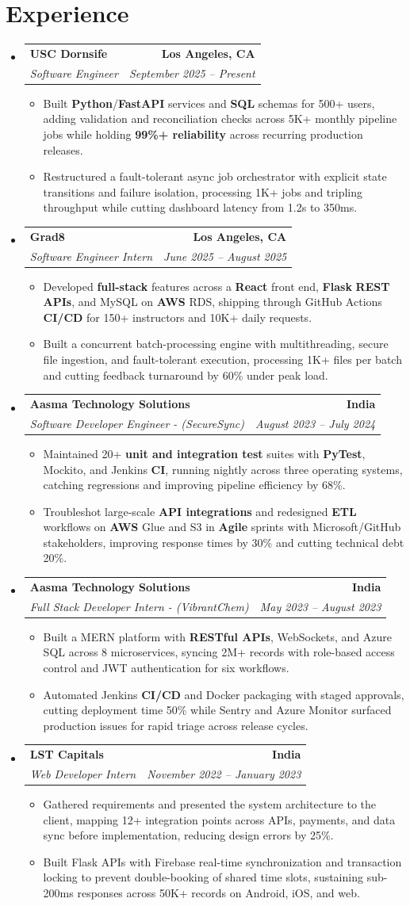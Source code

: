 \documentclass[letterpaper,10pt]{article}
\makeatletter
\newcommand{\itemTail}{\vspace{-4pt}}
\newcommand{\sectionGap}{\vspace{-8pt}}
\newcommand{\roleGap}{\vspace{2pt}}
\newcommand{\resumeItem}[1]{\item\small{{#1 \itemTail}}}
\newcommand{\resumeSubheading}[4]{\vspace{-1pt}\item\begin{tabular*}{1.0\textwidth}[t]{l@{\extracolsep{\fill}}r}\textbf{#1} & \textbf{\small #2} \\\textit{\small#3} & \textit{\small #4} \\\end{tabular*}\vspace{-2pt}}
\newcommand{\resumeSubHeadingListStart}{\begin{itemize}[leftmargin=0.0in, label={}]}
\newcommand{\resumeSubHeadingListEnd}{\end{itemize}}
\newcommand{\resumeItemListStart}{\begin{itemize}[leftmargin=0.15in,label=\textbullet,itemsep=3pt,topsep=0pt,parsep=0pt,partopsep=0pt]}
\newcommand{\resumeItemListEnd}{\end{itemize}\vspace{-4pt}}
\makeatother
\begin{document}
\section{Experience}
\resumeSubHeadingListStart
\resumeSubheading{USC Dornsife}{Los Angeles, CA}{Software Engineer}{September 2025 -- Present}
\resumeItemListStart
\resumeItem{Built \textbf{Python}/\textbf{FastAPI} services and \textbf{SQL} schemas for 500+ users, adding validation and reconciliation checks across 5K+ monthly pipeline jobs while holding \textbf{99\%+ reliability} across recurring production releases.}
\resumeItem{Restructured a fault-tolerant async job orchestrator with explicit state transitions and failure isolation, processing 1K+ jobs and tripling throughput while cutting dashboard latency from 1.2s to 350ms.}
\resumeItemListEnd
\roleGap
\resumeSubheading{Grad8}{Los Angeles, CA}{Software Engineer Intern}{June 2025 -- August 2025}
\resumeItemListStart
\resumeItem{Developed \textbf{full-stack} features across a \textbf{React} front end, \textbf{Flask} \textbf{REST APIs}, and MySQL on \textbf{AWS} RDS, shipping through GitHub Actions \textbf{CI/CD} for 150+ instructors and 10K+ daily requests.}
\resumeItem{Built a concurrent batch-processing engine with multithreading, secure file ingestion, and fault-tolerant execution, processing 1K+ files per batch and cutting feedback turnaround by 60\% under peak load.}
\resumeItemListEnd
\roleGap
\resumeSubheading{Aasma Technology Solutions}{India}{Software Developer Engineer - (SecureSync)}{August 2023 -- July 2024}
\resumeItemListStart
\resumeItem{Maintained 20+ \textbf{unit and integration test} suites with \textbf{PyTest}, Mockito, and Jenkins \textbf{CI}, running nightly across three operating systems, catching regressions and improving pipeline efficiency by 68\%.}
\resumeItem{Troubleshot large-scale \textbf{API integrations} and redesigned \textbf{ETL} workflows on \textbf{AWS} Glue and S3 in \textbf{Agile} sprints with Microsoft/GitHub stakeholders, improving response times by 30\% and cutting technical debt 20\%.}
\resumeItemListEnd
\roleGap
\resumeSubheading{Aasma Technology Solutions}{India}{Full Stack Developer Intern - (VibrantChem)}{May 2023 -- August 2023}
\resumeItemListStart
\resumeItem{Built a MERN platform with \textbf{RESTful APIs}, WebSockets, and Azure SQL across 8 microservices, syncing 2M+ records with role-based access control and JWT authentication for six workflows.}
\resumeItem{Automated Jenkins \textbf{CI/CD} and Docker packaging with staged approvals, cutting deployment time 50\% while Sentry and Azure Monitor surfaced production issues for rapid triage across release cycles.}
\resumeItemListEnd
\roleGap
\resumeSubheading{LST Capitals}{India}{Web Developer Intern}{November 2022 -- January 2023}
\resumeItemListStart
\resumeItem{Gathered requirements and presented the system architecture to the client, mapping 12+ integration points across APIs, payments, and data sync before implementation, reducing design errors by 25\%.}
\resumeItem{Built Flask APIs with Firebase real-time synchronization and transaction locking to prevent double-booking of shared time slots, sustaining sub-200ms responses across 50K+ records on Android, iOS, and web.}
\resumeItemListEnd
\resumeSubHeadingListEnd
\sectionGap
\end{document}
